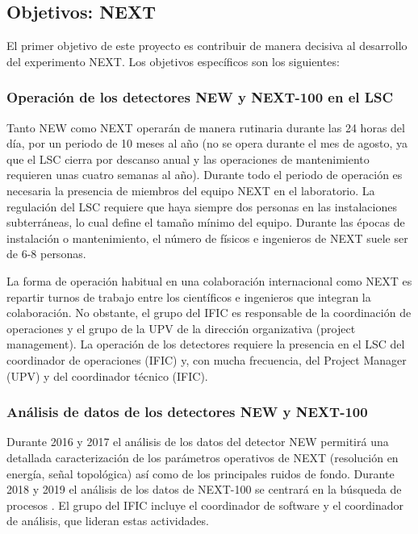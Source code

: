 \subsection*{Objetivos: NEXT}

El primer objetivo de este proyecto es contribuir de manera decisiva al desarrollo del experimento NEXT. Los objetivos específicos son los siguientes:

\subsubsection*{Operación de los detectores NEW y NEXT-100 en el LSC}

Tanto NEW como NEXT operarán de manera rutinaria durante las 24 horas del día, por un periodo de 10 meses al año (no se opera durante el mes de agosto, ya que el LSC cierra por descanso anual y las operaciones de mantenimiento requieren unas cuatro semanas al año). Durante todo el periodo de operación es necesaria la presencia de miembros del equipo NEXT en el laboratorio. La regulación del LSC requiere que haya siempre dos personas en las instalaciones subterráneas, lo cual define el tamaño mínimo del equipo. Durante las épocas de instalación o mantenimiento, el número de físicos e ingenieros de NEXT suele ser de 6-8 personas.

La forma de operación habitual en una colaboración internacional como NEXT es repartir turnos de trabajo entre los científicos e ingenieros que integran la colaboración. No obstante, el grupo del IFIC es responsable de la coordinación de operaciones y el grupo de la UPV de la dirección organizativa (project management). La operación de los detectores requiere la presencia en el LSC del coordinador de operaciones (IFIC) y, con mucha frecuencia, del Project Manager (UPV) y del coordinador técnico (IFIC). 

\subsubsection*{Análisis de datos de los detectores NEW y NEXT-100} 

Durante 2016 y 2017 el análisis de los datos del detector NEW permitirá una detallada caracterización de los parámetros operativos de NEXT (resolución en energía, señal topológica) así como de los principales ruidos de fondo. Durante 2018 y 2019 el análisis de los datos de NEXT-100 se centrará en la búsqueda de procesos \bbonu. El grupo del IFIC incluye el coordinador de software y el coordinador de análisis, que lideran estas actividades. 

